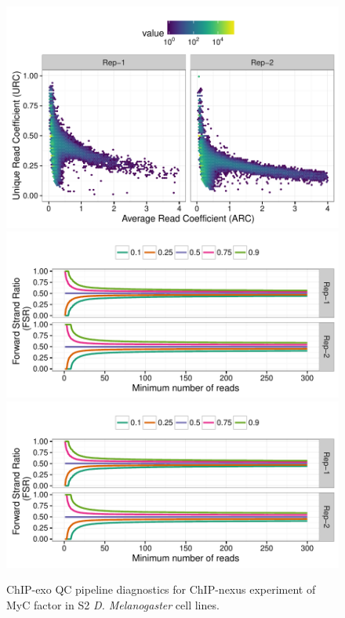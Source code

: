 \documentclass{article}
\begin{document}
\begin{figure}[H]
  \centering
  \includegraphics[width = .65\textwidth,page =
1]{figures/supplement/QC/ChIPnexus_S2_myc_enrichment.pdf}\\
\includegraphics[width = .65\textwidth,page =
1]{figures/supplement/QC/ChIPnexus_S2_myc_strand_imbalance.pdf}
\includegraphics[width = .65\textwidth,page =
3]{figures/supplement/QC/ChIPnexus_S2_myc_strand_imbalance.pdf}
\caption{ChIP-exo QC pipeline diagnostics for ChIP-nexus experiment of
  MyC factor in S2 \emph{D. Melanogaster} cell lines.}
  \label{sfig:qc10}
\end{figure}
\end{document}
